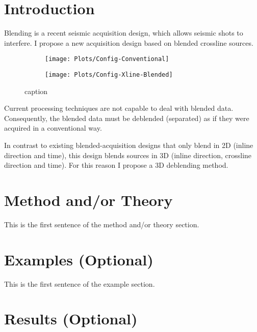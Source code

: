 \documentclass{madrid15WS}
\begin{document}
\section{Introduction}

Blending is a recent seismic acquisition design, which allows seismic shots to interfere. I propose a new acquisition design based on blended crossline sources. 

\begin{figure}[h!]
	\centering
	\begin{subfigure}[t]{0.3\textwidth}
		\centering
		\texttt{[image: Plots/Config-Conventional]}
		\caption{}
		\label{fig:Intro-Config-Conventional}
	\end{subfigure}
	\qquad \qquad 
	\centering
	\begin{subfigure}[t]{0.3\textwidth}
		\centering
		\texttt{[image: Plots/Config-Xline-Blended]}
		\caption{}
		\label{fig:Intro-Config-Xline-Blended}
	\end{subfigure}
	
	\caption{caption}
	\label{fig:Intro-Configs}
	
\end{figure}



Current processing techniques are not capable to deal with blended data. Consequently, the blended data must be deblended (separated) as if they were acquired in a conventional way.  


In contrast to existing blended-acquisition designs that only blend in 2D (inline direction and time), this design blends sources in 3D (inline direction, crossline direction and time). For this reason I propose a 3D deblending method. 

\section{Method and/or Theory}

This is the first sentence of the method and/or theory section.

\section{Examples (Optional)}

This is the first sentence of the example section.

\section{Results (Optional)}
\end{document}
